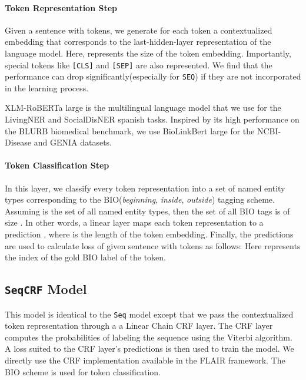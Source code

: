 \documentclass[11pt]{article}
\begin{document}
\paragraph{Token Representation Step} 
Given a sentence  with  tokens, we generate for each token   
a contextualized embedding  
that corresponds to the last-hidden-layer 
representation of the language model. 
Here,  represents the size of the token embedding.
Importantly, special tokens like \texttt{[CLS]} and \texttt{[SEP]} are also represented. 
We find that the performance can drop significantly(especially for \texttt{SEQ}) if they are not incorporated in the learning process.

XLM-RoBERTa large\cite{xlm} is the multilingual language model that we use for the LivingNER and SocialDisNER spanish tasks.
Inspired by its high performance on the BLURB\cite{gu2021domain} biomedical benchmark, 
we use BioLinkBert large\cite{yasunaga-etal-2022-linkbert} for the NCBI-Disease and GENIA datasets.

\paragraph{Token Classification Step} In this layer, we classify every token
representation into a set of named entity types corresponding to the
BIO(\textit{beginning}, \textit{inside}, \textit{outside}) tagging scheme.
Assuming  is the set of all named entity types,
then the set of all BIO tags  is of size . In other
words, a linear layer maps each token representation  to a prediction , where
 is the length of the token embedding. Finally, the predictions are used to
calculate loss of given sentence  with  tokens as follows:
 Here  represents the index of the gold BIO label of the
 token.

\subsection{\texttt{SeqCRF} Model}
This model is identical to the \texttt{Seq} model except that
we pass the contextualized token representation  through a a Linear Chain CRF\cite{lafferty2001conditional} layer.
The CRF layer computes the probabilities of labeling the sequence using the Viterbi algorithm\cite{forney1973viterbi}.
A loss suited to the CRF layer's predictions is then used to train the model. 
We directly use the CRF implementation available in the FLAIR\cite{akbik-etal-2019-flair} framework. The BIO scheme is used for token classification.
\end{document}

